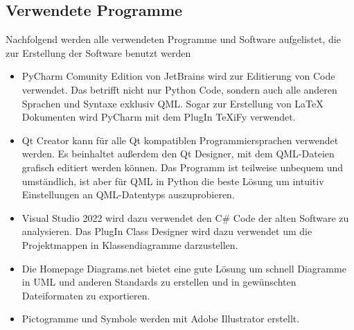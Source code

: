 \subsection{Verwendete Programme }

Nachfolgend werden alle verwendeten Programme und Software aufgelistet, die zur Erstellung der Software benutzt werden
\begin{itemize}
        \item PyCharm Comunity Edition von JetBrains wird zur Editierung von Code verwendet. Das betrifft nicht nur Python Code,
        sondern auch alle anderen Sprachen und Syntaxe exklusiv QML. Sogar zur Erstellung von LaTeX Dokumenten wird
        PyCharm mit dem PlugIn TeXiFy verwendet.
        \item Qt Creator kann für alle Qt kompatiblen Programmiersprachen verwendet werden. Es beinhaltet außerdem den
        Qt Designer, mit dem QML-Dateien grafisch editiert werden können. Das Programm ist teilweise unbequem und umständlich,
        ist aber für QML in Python die beste Lösung um intuitiv Einstellungen an QML-Datentyps auszuprobieren.
        \item Visual Studio 2022 wird dazu verwendet den C\# Code der alten Software zu analysieren.
        Das PlugIn \glqq Class Designer\grqq{} wird dazu verwendet um die Projektmappen in Klassendiagramme darzustellen.
        \item Die Homepage Diagrams.net bietet eine gute Lösung um schnell Diagramme in UML und anderen Standards zu erstellen und
        in gewünschten Dateiformaten zu exportieren.
        \item Pictogramme und Symbole werden mit Adobe Illustrator erstellt.
\end{itemize}